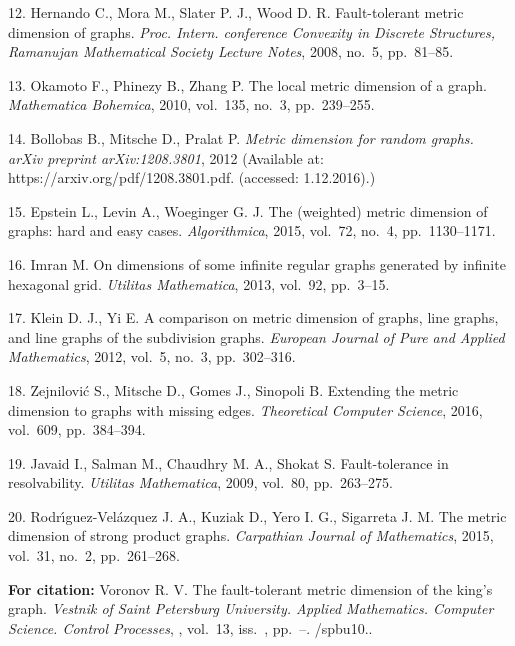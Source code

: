 {12. Hernando C., Mora M., Slater P. J., Wood D. R. Fault-tolerant
metric dimension of graphs. {\it Proc. Intern. conference
Convexity in Discrete Structures, Ramanujan Mathematical Society
Lecture Notes}, 2008, no.~5, pp.~81--85.

13. Okamoto F., Phinezy B., Zhang P. The local metric dimension of
a graph. {\it Mathematica Bohemica}, 2010, vol.~135, no.~3,
pp.~239--255.

14. Bollobas B., Mitsche D., Pralat P. {\it Metric dimension for
random graphs. arXiv preprint arXiv:1208.3801}, 2012 (Available
at: https://arxiv.org/pdf/1208.3801.pdf. (accessed: 1.12.2016).)

15. Epstein L., Levin A., Woeginger G. J. The (weighted) metric
dimension of graphs: hard and easy cases. {\it Algorithmica},
2015, vol.~72, no.~4, pp.~1130--1171.

16. Imran M. On dimensions of some infinite regular graphs
generated by infinite hexagonal grid. {\it Utilitas Mathematica},
2013, vol.~92, pp.~3--15.

17. Klein D. J., Yi E. A comparison on metric dimension of graphs,
line graphs, and line graphs of the subdivision graphs. {\it
European Journal of Pure and Applied Mathematics}, 2012, vol.~5,
no.~3, pp.~302--316.

18. Zejnilovi{\'c} S., Mitsche D., Gomes J., Sinopoli B. Extending
the metric dimension to graphs with missing edges. {\it
Theoretical Computer Science}, 2016, vol.~609, pp.~384--394.

19. Javaid I., Salman M., Chaudhry M. A., Shokat S.
Fault-tolerance in resolvability. {\it Utilitas Mathematica},
2009, vol.~80, pp.~263--275.

20. Rodr\'{\i}guez-Vel\'azquez J. A., Kuziak D., Yero I. G.,
Sigarreta J. M. The metric dimension of strong product graphs.
{\it Carpathian Journal of Mathematics}, 2015, vol.~31, no.~2,
pp.~261--268.



\vskip 2mm

{\bf For citation:}  Voronov   R. V. The fault-tolerant metric
dimension of the king's graph. {\it Vestnik of Saint Petersburg
University. Applied Mathematics. Computer Science. Control
Processes}, \issueyear, vol.~13, iss.~\issuenum,
pp.~\pageref{p2}--\pageref{p2e}.
\doivyp/spbu10.\issueyear.



}
